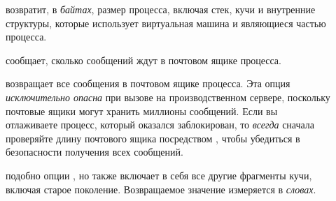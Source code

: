 \documentclass[11pt, oneside]{book}   	%
\begin{document}
\begin{description*}
\begin{description}
	\item[] возвратит, в \emph{байтах}, размер процесса, включая стек, кучи и внутренние структуры, которые использует виртуальная машина и являющиеся частью процесса.

	\item[] сообщает, сколько сообщений ждут в почтовом ящике процесса.

	\item[] возвращает все сообщения в почтовом ящике процесса. Эта опция \emph{исключительно опасна} при вызове на производственном сервере, поскольку почтовые ящики могут хранить миллионы сообщений. Если вы отлаживаете процесс, который оказался заблокирован, то \emph{всегда} сначала проверяйте длину почтового ящика  посредством , чтобы убедиться в безопасности получения всех сообщений.

	\item[] подобно опции , но также включает в себя все другие фрагменты кучи, включая старое поколение. Возвращаемое значение измеряется в \emph{словах}.
	\end{description}
	

\end{description*}
\end{document}
